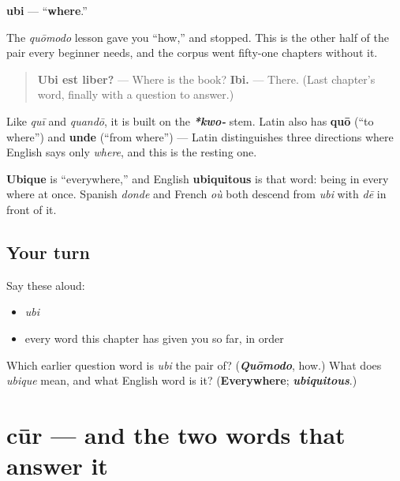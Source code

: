 \begin{cousinweb}
\textbf{ubi} — \textquotedblleft{}\textbf{where}.\textquotedblright{}

The \emph{quōmodo} lesson gave you \textquotedblleft{}how,\textquotedblright{} and stopped. This is the other half of the pair every beginner needs, and the corpus went fifty-one chapters without it.

\begin{quote}
\textbf{Ubi est liber?} — Where is the book? \textbf{Ibi.} — There. (Last chapter's word, finally with a question to answer.)
\end{quote}

Like \emph{quī} and \emph{quandō}, it is built on the \emph{\textbf{*kwo-}} stem. Latin also has \textbf{quō} (\textquotedblleft{}to where\textquotedblright{}) and \textbf{unde} (\textquotedblleft{}from where\textquotedblright{}) — Latin distinguishes three directions where English says only \emph{where}, and this is the resting one.

\textbf{Ubique} is \textquotedblleft{}everywhere,\textquotedblright{} and English \textbf{ubiquitous} is that word: being in every where at once. Spanish \emph{donde} and French \emph{où} both descend from \emph{ubi} with \emph{dē} in front of it.
\end{cousinweb}

\subsection*{Your turn}
Say these aloud:

\begin{itemize}
\raggedright
  \item \emph{ubi}
  \item every word this chapter has given you so far, in order
\end{itemize}

\begin{tcolorbox}[breakable,colback=teal!4,colframe=teal!35!black,title={Before you move on}]
Which earlier question word is \emph{ubi} the pair of? (\emph{\textbf{Quōmodo}}, how.) What does \emph{ubique} mean, and what English word is it? (\textbf{Everywhere}; \emph{\textbf{ubiquitous}}.)
\end{tcolorbox}
\section[cūr]{cūr — and the two words that answer it}

